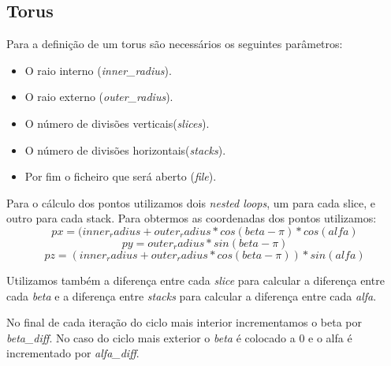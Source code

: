 \documentclass[14pt, a4 paper]{article}
\begin{document}
\subsection{Torus}
Para a definição de um torus são necessários os seguintes parâmetros:

\begin{itemize}
\item O raio interno (\textit{inner\_radius}).

\item O raio externo (\textit{outer\_radius}).

\item O número de divisões verticais(\textit{slices}).

\item O número de divisões horizontais(\textit{stacks}).

\item Por fim o ficheiro que será aberto (\textit{file}).
\end{itemize}
Para o cálculo dos pontos utilizamos dois \textit{nested loops}, um para cada slice, e outro para cada stack.
Para obtermos as coordenadas dos pontos utilizamos:
$$
px = (inner_radius + outer_radius * cos(beta - \pi) * cos(alfa)
$$
$$
py = outer_radius*sin(beta - \pi)
$$
$$
pz = (inner_radius + outer_radius * cos(beta - \pi)) * sin(alfa)
$$

Utilizamos também a diferença entre cada \textit{slice} para calcular a diferença entre cada \textit{beta} e a diferença entre \textit{stacks} para calcular a diferença entre cada \textit{alfa}.

No final de cada iteração do ciclo mais interior incrementamos o beta por \textit{beta\_diff}. No caso do ciclo mais exterior o \textit{beta} é colocado a $0$ e o alfa é incrementado por \textit{alfa\_diff}.
\end{document}
